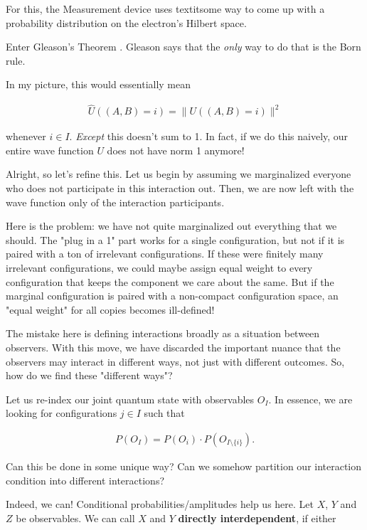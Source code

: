 \documentclass{article}
\begin{document}
For this, the Measurement device uses textit{some} way to come up with a probability distribution on the electron's Hilbert space.

Enter Gleason's Theorem \cite{Gleason1957}. Gleason says that the \textit{only} way to do that is the Born rule.

In my picture, this would essentially mean

\begin{align*}
\widehat{U}((A,B) = i) = \|U((A,B) = i)\|^2
\end{align*}

whenever $i\in I$. \textit{Except} this doesn't sum to 1. In fact, if we do this naively, our entire wave function $U$ does not have norm 1 anymore!

Alright, so let's refine this. Let us begin by assuming we marginalized everyone who does not participate in this interaction out. Then, we are now left with the wave function only of the interaction participants.

Here is the problem: we have not quite marginalized out everything that we should. The "plug in a 1" part works for a single configuration, but not if it is paired with a ton of irrelevant configurations. If these were finitely many irrelevant configurations, we could maybe assign equal weight to every configuration that keeps the component we care about the same. But if the marginal configuration is paired with a non-compact configuration space, an "equal weight" for all copies becomes ill-defined! 

The mistake here is defining interactions broadly as a situation between observers. With this move, we have discarded the important nuance that the observers may interact in different ways, not just with different outcomes. So, how do we find these "different ways"?

Let us re-index our joint quantum state with observables $O_I$. In essence, we are looking for configurations $j\in I$ such that

\begin{align*}
P(O_I) = P(O_i) \cdot P(O_{I\setminus\lbrace i\rbrace}).
\end{align*}

Can this be done in some unique way? Can we somehow partition our interaction condition into different interactions?

Indeed, we can! Conditional probabilities/amplitudes help us here. Let $X$, $Y$ and $Z$ be observables. We can call $X$ and $Y$ \textbf{directly interdependent}, if either
\end{document}
